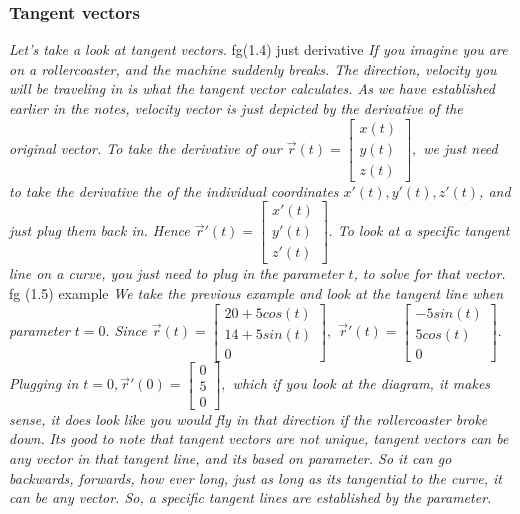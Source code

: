 \documentclass[addpoints]{exam}
\begin{document}
\subsubsection{Tangent vectors}
\textit{
Let's take a look at tangent vectors.
}
fg(1.4) just derivative
\textit{
If you imagine you are on a rollercoaster, and the machine suddenly breaks. The direction, velocity you will be traveling in is what the tangent vector calculates. As we have established earlier in the notes, velocity vector is just depicted by the derivative of the original vector. To take the derivative of our $\vec{r}(t)=\begin{bmatrix}
    x(t)\\y(t)\\z(t)
\end{bmatrix},$ we just need to take the derivative the of the individual coordinates $x'(t), y'(t), z'(t)$, and just plug them back in. Hence $\vec{r}'(t)=\begin{bmatrix}
    x'(t)\\y'(t)\\z'(t)
\end{bmatrix}.$ To look at a specific tangent line on a curve, you just need to plug in the parameter $t$, to solve for that vector.
}
fg (1.5) example
\textit{
We take the previous example and look at the tangent line when parameter $t=0.$ Since $\vec{r}(t)=\begin{bmatrix}
    20+5cos(t)\\14+5sin(t)\\0
\end{bmatrix},$ $\vec{r}'(t)=\begin{bmatrix}
    -5sin(t)\\5cos(t)\\0
\end{bmatrix}.$ Plugging in $t=0,$$\vec{r}'(0)=\begin{bmatrix}
    0\\5\\0
\end{bmatrix},$ which if you look at the diagram, it makes sense, it does look like you would fly in that direction if the rollercoaster broke down.
}
\textit{
Its good to note that tangent vectors are not unique, tangent vectors can be any vector in that tangent line, and its based on parameter. So it can go backwards, forwards, how ever long, just as long as its tangential to the curve, it can be any vector. So, a specific tangent lines are established by the parameter.
}
\end{document}
